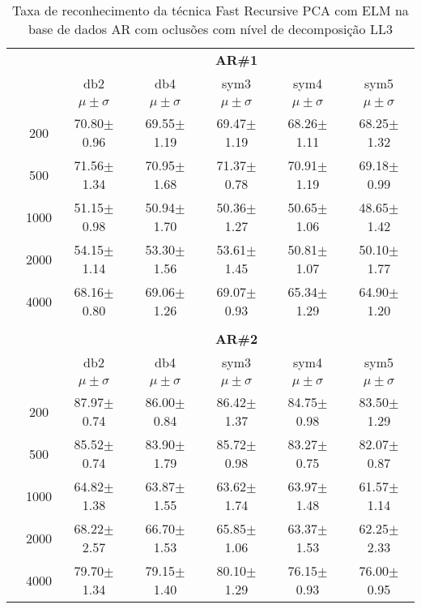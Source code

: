 \begin{table}[H]
	\centering
    \normalsize
	\caption{Taxa de reconhecimento da técnica Fast Recursive  PCA com ELM na base de dados AR com oclusões com nível de decomposição LL3}
	\begin{tabular}{|c|c|c c c c c|}
\cline{3-7}
\multicolumn{2}{c|}{\multirow{3}{*}{}} & \multicolumn{5}{c|}{\textbf{AR\#1}}   \\\cline{3-7} 
\multicolumn{2}{c|}{}  & db2 & db4 & sym3 & sym4 & sym5 \\\cline{3-7}%
\multicolumn{2}{c|}{}& $\mu \pm \sigma$ & $\mu \pm \sigma$ & $\mu \pm \sigma$ & $\mu \pm \sigma$ & $\mu \pm \sigma$ \\\hline


\multicolumn{1}{|c|}{ \multirow{5}{*}{\rotatebox[origin=c]{90}{\textbf{Neurônios}}} }
&200	&70.80$\pm$0.96	&69.55$\pm$1.19	&69.47$\pm$1.19	&68.26$\pm$1.11	&68.25$\pm$1.32	\\\cline{2-7}
&500	&71.56$\pm$1.34	&70.95$\pm$1.68	&71.37$\pm$0.78	&70.91$\pm$1.19	&69.18$\pm$0.99	\\\cline{2-7}
&1000	&51.15$\pm$0.98	&50.94$\pm$1.70	&50.36$\pm$1.27	&50.65$\pm$1.06	&48.65$\pm$1.42	\\\cline{2-7}
&2000	&54.15$\pm$1.14	&53.30$\pm$1.56	&53.61$\pm$1.45	&50.81$\pm$1.07	&50.10$\pm$1.77	\\\cline{2-7}
&4000	&68.16$\pm$0.80	&69.06$\pm$1.26	&69.07$\pm$0.93	&65.34$\pm$1.29	&64.90$\pm$1.20	


\\\midrule%

\multicolumn{7}{c}{}\\ 

\cline{3-7}
\multicolumn{2}{c|}{\multirow{3}{*}{}} & \multicolumn{5}{c|}{\textbf{AR\#2}}   \\\cline{3-7} 

\multicolumn{2}{c|}{}  & db2 & db4 & sym3 & sym4 & sym5 \\\cline{3-7}
\multicolumn{2}{c|}{}& $\mu \pm \sigma$ & $\mu \pm \sigma$ & $\mu \pm \sigma$ & $\mu \pm \sigma$ & $\mu \pm \sigma$ \\\hline


\multicolumn{1}{|c|}{ \multirow{5}{*}{\rotatebox[origin=c]{90}{\textbf{Neurônios}}} }
&200	&87.97$\pm$0.74	&86.00$\pm$0.84	&86.42$\pm$1.37	&84.75$\pm$0.98	&83.50$\pm$1.29	\\\cline{2-7}
&500	&85.52$\pm$0.74	&83.90$\pm$1.79	&85.72$\pm$0.98	&83.27$\pm$0.75	&82.07$\pm$0.87	\\\cline{2-7}
&1000	&64.82$\pm$1.38	&63.87$\pm$1.55	&63.62$\pm$1.74	&63.97$\pm$1.48	&61.57$\pm$1.14	\\\cline{2-7}
&2000	&68.22$\pm$2.57	&66.70$\pm$1.53	&65.85$\pm$1.06	&63.37$\pm$1.53	&62.25$\pm$2.33	\\\cline{2-7}
&4000	&79.70$\pm$1.34	&79.15$\pm$1.40	&80.10$\pm$1.29	&76.15$\pm$0.93 &76.00$\pm$0.95	



\end{tabular}
\end{table}
